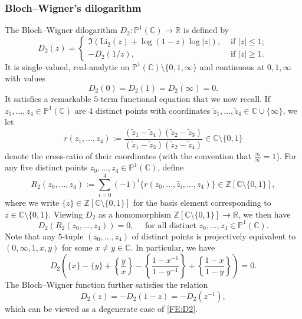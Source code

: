 \documentclass[11pt,a4,leqno]{amsart}
\theoremstyle{my theoremstyle}
\theoremstyle{dfn}
\theoremstyle{remark}
\renewcommand{\1}{\mathbbm{1}}
\newcommand{\Z}{\mathbb{Z}}
\newcommand{\R}{\mathbb{R}}
\newcommand{\C}{\mathbb{C}}
\numberwithin{equation}{section}
\begin{document}
\subsubsection{Bloch--Wigner's dilogarithm}
The Bloch--Wigner dilogarithm $D_2 \colon \mathbb{P}^1(\C) \to \R$ is defined by
\begin{equation}\label{BWlog}
    D_2(z)=
    \begin{cases}
        \Im (\mathrm{Li}_2(z) + \log(1-z)\log \vert z\vert), & \text{ if } \vert z\vert \leq 1; \\
        -D_2(1/z), & \text{ if } \vert z\vert \geq 1.
    \end{cases}
\end{equation}
It is single-valued, real-analytic on $\mathbb{P}^1(\C)\setminus \{ 0,1,\infty \}$ and continuous at $0,1,\infty$ with values 
\begin{equation}\label{D2:value}
    D_2(0)=D_2(1)=D_2(\infty)=0.
\end{equation}
It satisfies a remarkable $5$-term functional equation that we now recall. If $z_1, \ldots, z_4 \in \mathbb{P}^1(\C)$ are $4$ distinct points with coordinates $\tilde z_1, \ldots, \tilde z_4 \in \C\cup \{\infty \}$, we let
\[
r(z_1, \ldots, z_4):=\frac{(\tilde z_1-\tilde z_4)(\tilde z_2-\tilde z_3)}{(\tilde z_1-\tilde z_3)(\tilde z_2-\tilde z_4)} \in \C\setminus \{ 0,1 \}
\]
denote the cross-ratio of their coordinates (with the convention that $\frac{\infty}{\infty} =1$). For any five distinct points $z_0, \ldots, z_4 \in \mathbb{P}^1(\C)$, define 
\begin{equation}\label{R2}
R_2(z_0, \ldots, z_4):=\sum_{i=0}^4 (-1)^i \{ r(z_0, \ldots, \hat{z}_i, \ldots, z_4) \} \in \Z[\C\setminus \{ 0,1 \}],
\end{equation}
where we write $\{ z \} \in \Z[\C\setminus \{ 0,1 \}]$ for the basis element corresponding to $z\in \C\setminus \{ 0,1 \}$.
Viewing $D_2$ as a homomorphism $\Z[\C\setminus \{ 0,1 \}] \to \R$, we then have 
\begin{equation}\label{FE:D2}
D_2(R_2(z_0, \ldots, z_4))=0, \quad \text{ for all distinct } z_0, \ldots, z_4 \in \mathbb{P}^1(\C).
\end{equation}
Note that any $5$-tuple $(z_0, \ldots, z_4)$ of distinct points is projectively equivalent to $(0, \infty, 1, x, y)$ for some $x\neq y \in \C$. In particular, we have 
\begin{equation}\label{FE:D22}
D_2\left( \{ x \}- \{ y \}+\left\{\frac{y}{x}\right\}-\left\{\frac{1-x^{-1}}{1-y^{-1}}\right\}+\left\{\frac{1-x}{1-y}\right\} \right)=0.
\end{equation}
The Bloch--Wigner function further satisfies the relation 
\begin{equation}\label{FE:D23}
    D_2(z)=-D_2(1-z)=-D_2(z^{-1}),
\end{equation}
which can be viewed as a degenerate case of \eqref{FE:D2}.
\end{document}
